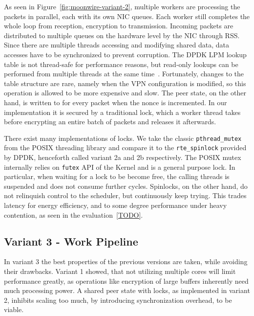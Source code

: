 As seen in Figure~\ref{fig:moonwire-variant-2}, multiple workers are processing the packets in parallel, each with its own NIC queues. Each worker still completes the whole loop from reception, encryption to transmission. Incoming packets are distributed to multiple queues on the hardware level by the NIC through RSS.
Since there are multiple threads accessing and modifying shared data, data accesses have to be synchronized to prevent corruption. 
The DPDK LPM lookup table is not thread-safe for performance reasons, but read-only lookups can be performed from multiple threads at the same time~\cite{dpdk-fastpath-api}. Fortunately, changes to the table structure are rare, namely when the VPN configuration is modified, so this operation is allowed to be more expensive and slow. 
The peer state, on the other hand, is written to for every packet when the nonce is incremented. In our implementation it is secured by a traditional lock, which a worker thread takes before encrypting an entire batch of packets and releases it afterwards.

There exist many implementations of locks. We take the classic \texttt{pthread\_mutex} from the POSIX threading library and compare it to the \texttt{rte\_spinlock} provided by DPDK, henceforth called variant 2a and 2b respectively. The POSIX mutex internally relies on \texttt{futex} API of the Kernel and is a general purpose lock. In particular, when waiting for a lock to be become free, the calling threads is suspended and does not consume further cycles.
Spinlocks, on the other hand, do not relinquish control to the scheduler, but continuously keep trying. 
This trades latency for energy efficiency, and to some degree performance under heavy contention, as seen in the evaluation~\ref{TODO}.  


\subsection{Variant 3 - Work Pipeline}
In variant 3 the best properties of the previous versions are taken, while avoiding their drawbacks. 
Variant 1 showed, that not utilizing multiple cores will limit performance greatly, as operations like encryption of large buffers inherently need much processing power.
A shared peer state with locks, as implemented in variant 2, inhibits scaling too much, by introducing synchronization overhead, to be viable. 

